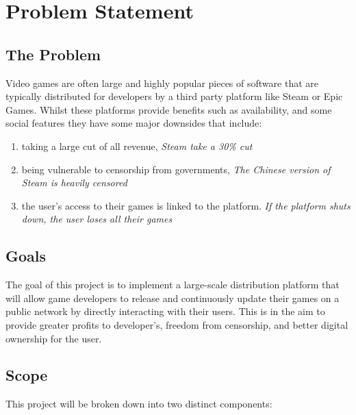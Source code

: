 
\chapter{Problem Statement}

\section{The Problem}
\label{sec:problem}

Video games are often large and highly popular pieces of software that are typically distributed for developers by a third party platform like Steam or Epic Games. Whilst these platforms provide benefits such as availability, and some social features they have some major downsides that include:
\vspace{1mm}
\begin{enumerate}[label=(\alph*)]
  \item taking a large cut of all revenue, \newline\textit{Steam take a 30\% cut~\cite{marks_report_2019,brown_valve_2021}}
  \item being vulnerable to censorship from governments, \newline\textit{The Chinese version of Steam is heavily censored~\cite{steamdb_steam_2021}}
  \item the user's access to their games is linked to the platform. \newline\textit{If the platform shuts down, the user loses all their games}
\end{enumerate}
\vspace{1mm}

\section{Goals}

The goal of this project is to implement a large-scale distribution platform that will allow game developers to release and continuously update their games on a public network by directly interacting with their users. This is in the aim to provide greater profits to developer's, freedom from censorship, and better digital ownership for the user.

\section{Scope}

This project will be broken down into two distinct components:

